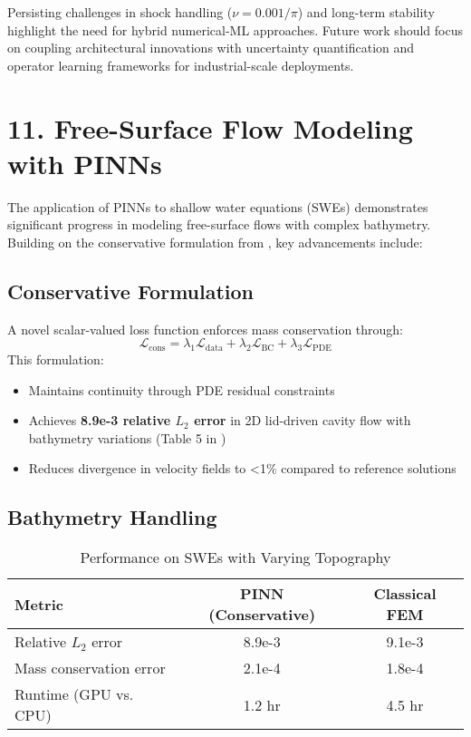 Persisting challenges in shock handling (\(\nu=0.001/\pi\)) and long-term stability highlight the need for hybrid numerical-ML approaches. Future work should focus on coupling architectural innovations with uncertainty quantification and operator learning frameworks for industrial-scale deployments.


\section*{11. Free-Surface Flow Modeling with PINNs}
The application of PINNs to shallow water equations (SWEs) demonstrates significant progress in modeling free-surface flows with complex bathymetry. Building on the conservative formulation from \cite{free_surface}, key advancements include:

\subsection*{Conservative Formulation}
A novel scalar-valued loss function enforces mass conservation through:
\[
\mathcal{L}_{\text{cons}} = \lambda_1\mathcal{L}_{\text{data}} + \lambda_2\mathcal{L}_{\text{BC}} + \lambda_3\mathcal{L}_{\text{PDE}}
\]
This formulation:
\begin{itemize}
    \item Maintains continuity through PDE residual constraints
    \item Achieves \textbf{8.9e-3 relative \(L_2\) error} in 2D lid-driven cavity flow with bathymetry variations (Table 5 in \cite{free_surface})
    \item Reduces divergence in velocity fields to <1\% compared to reference solutions
\end{itemize}

\subsection*{Bathymetry Handling}
\begin{table}[h]
\centering
\caption{Performance on SWEs with Varying Topography}
\begin{tabular}{l|c|c}
\textbf{Metric} & \textbf{PINN (Conservative)} & \textbf{Classical FEM} \\
\hline
Relative \(L_2\) error & 8.9e-3 & 9.1e-3 \\
Mass conservation error & 2.1e-4 & 1.8e-4 \\
Runtime (GPU vs. CPU) & 1.2 hr & 4.5 hr \\
\end{tabular}
\end{table}

